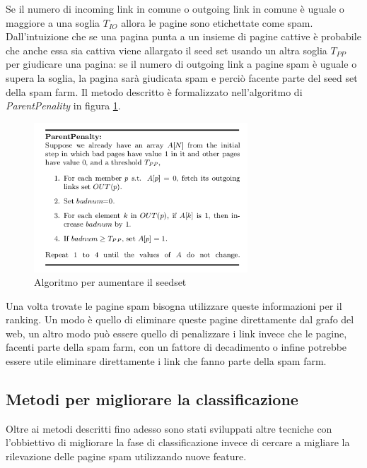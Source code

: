 Se il numero di incoming link in comune o outgoing link in comune è  uguale o maggiore a una soglia \(T_{IO}\) allora le pagine sono etichettate come spam.  Dall'intuizione che se una pagina punta a un insieme di pagine cattive è probabile che anche essa sia cattiva viene allargato il seed set usando un altra soglia \(T_{PP}\) per giudicare una pagina: se il numero di outgoing link a pagine spam è uguale o supera la soglia, la pagina sarà giudicata spam e perciò facente parte del seed set della spam farm. Il metodo descritto è formalizzato nell'algoritmo di \textit{ParentPenality} in figura \ref{fig:linkfarm2}.
\begin{figure}
\centering
\includegraphics[width=8cm]{immagini/linkfarm/immagine2.png}
\caption{Algoritmo per aumentare il seedset}
\label{fig:linkfarm2}
\end{figure}
Una volta trovate le pagine spam bisogna utilizzare queste informazioni per il ranking. Un modo è quello di eliminare queste pagine direttamente dal grafo del web, un altro modo può essere quello di penalizzare i link invece che le pagine, facenti parte della spam farm, con un fattore di decadimento o infine potrebbe essere utile eliminare direttamente i link che fanno parte della spam farm.

\subsection{Metodi per migliorare la classificazione}
Oltre ai metodi descritti fino adesso sono stati sviluppati altre tecniche con l'obbiettivo di migliorare la fase di classificazione invece di cercare a migliare la rilevazione delle pagine spam utilizzando nuove feature.

